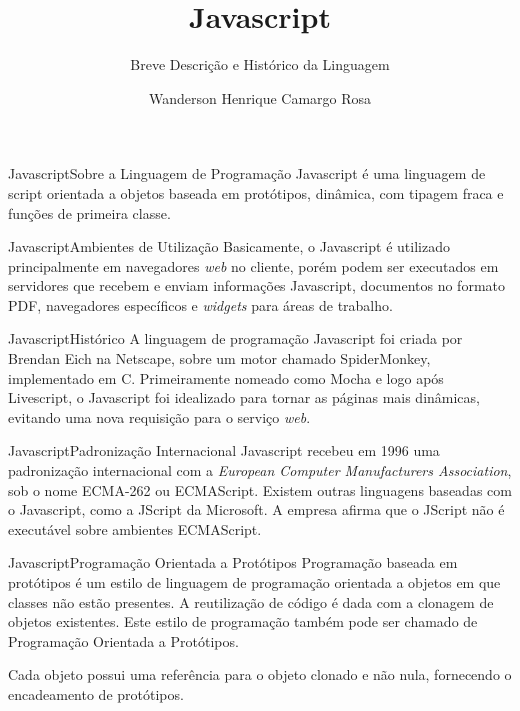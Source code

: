 \documentclass[hyperref={pdfpagelabels=false}]{beamer}
\author[ROSA]{Wanderson Henrique Camargo Rosa}
\title[JS]{Javascript}
\subtitle{Breve Descrição e Histórico da Linguagem}
\institute[UNISINOS]{Linguagens de Programação 2011/1\\Centro de
Ciências Exatas e Tecnológicas\\Universidade do Vale do Rio dos Sinos ---
UNISINOS}
\begin{document}
\begin{frame}
    \maketitle{}
\end{frame}

\begin{frame}{Javascript}{Sobre a Linguagem de Programação}
    Javascript\cite{mozilla,wikipedia} é uma linguagem de script orientada a
    objetos baseada em protótipos, dinâmica, com tipagem fraca e funções de
    primeira classe.
\end{frame}

\begin{frame}{Javascript}{Ambientes de Utilização}
    Basicamente, o Javascript é utilizado principalmente em navegadores
    \emph{web}\cite{mozilla} no cliente, porém podem ser executados em
    servidores\cite{mozilla} que recebem e enviam informações Javascript,
    documentos no formato PDF, navegadores específicos e \emph{widgets} para
    áreas de trabalho\cite{wikipedia}.
\end{frame}

\begin{frame}{Javascript}{Histórico}
    A linguagem de programação Javascript foi criada por Brendan
    Eich\cite{mozilla,wikipedia} na Netscape, sobre um motor chamado
    SpiderMonkey\cite{mozilla}, implementado em C. Primeiramente nomeado como
    Mocha\cite{wikipedia} e logo após
    Livescript\cite{history,diff,wikipedia,plotter}, o Javascript foi idealizado
    para tornar as páginas mais dinâmicas, evitando uma nova requisição para o
    serviço \emph{web}\cite{history}.
\end{frame}

\begin{frame}{Javascript}{Padronização Internacional}
    Javascript recebeu em 1996 uma padronização internacional\cite{history} com
    a \emph{European Computer Manufacturers Association}, sob o nome ECMA-262 ou
    ECMAScript. Existem outras linguagens baseadas com o Javascript, como a
    JScript da Microsoft\cite{diff}. A empresa afirma que o JScript não é
    executável sobre ambientes ECMAScript\cite{wikipedia}.
\end{frame}

\begin{frame}{Javascript}{Programação Orientada a Protótipos}
    Programação baseada em protótipos\cite{prototype} é um estilo de linguagem
    de programação orientada a objetos em que classes não estão presentes. A
    reutilização de código é dada com a clonagem de objetos existentes. Este
    estilo de programação também pode ser chamado de Programação Orientada a
    Protótipos\cite{prototype}.

    Cada objeto possui uma referência para o objeto clonado e não nula,
    fornecendo o encadeamento de protótipos\cite{ecma}.
\end{frame}

\begin{frame}
    
    
\end{frame}
\end{document}

